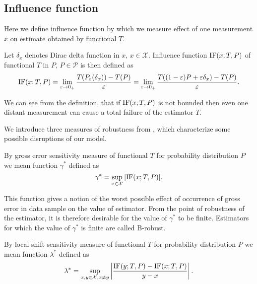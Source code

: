 \subsection{Influence  function}

Here we define influence function by which we measure effect of one measurement $x$ on estimate obtained by functional $T$.

\begin{definition}
	Let $\delta_x$ denotes Dirac delta function in $x,\, x \in \mathcal{X}$. Influence function $\mathrm{IF}({x};T,P)$ of functional $T$ in $P,\, P \in \mathcal{P}$ is then defined as
	\begin{equation}
		\mathrm{IF}({x};T,P) = \lim_{\varepsilon \rightarrow 0_+} \frac{T(P_\varepsilon(\delta_x)) - T(P)}{\varepsilon} = \lim_{\varepsilon \rightarrow 0_+} \frac{T((1-\varepsilon)P + \varepsilon\delta_x) - T(P)}{\varepsilon}.
	\end{equation} 
\end{definition}

We can see from the definition, that if $\mathrm{IF}({x};T,P)$ is not bounded then even one distant measurement can cause a total failure of the estimator $T$.

We introduce three measures of robustness from \cite{Antoch92}, which characterize some possible disruptions of our model. 

\begin{definition}
	By gross error sensitivity measure of functional $T$ for probability distribution $P$ we mean function  $\gamma^*$ defined as 
	\begin{equation}
		\gamma^* = \sup_{x \in \mathcal{X}} |\mathrm{IF}({x};T,P)|.
	\end{equation}
\end{definition}
This function gives a notion of the worst possible effect of occurrence of gross error in data sample on the value of estimator.  From the point of robustness of the estimator, it is therefore desirable for the value of $\gamma^*$ to be finite. Estimators for which the value of $\gamma^*$ is finite are called B-robust.

\begin{definition}
	By local shift sensitivity measure of functional $T$ for probability distribution $P$ we mean function  $\lambda^*$ defined as 
	\begin{equation}
			\lambda^* = \sup_{x,y \in \mathcal{X},x \neq y}  \left| \frac{\mathrm{IF}({y};T,P) - \mathrm{IF}({x};T,P)}{y-x} \right|.
	\end{equation}
\end{definition}


